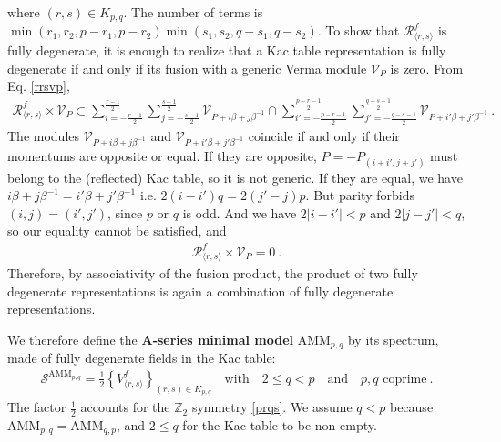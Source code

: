 \documentclass[12pt, a4paper]{article}
\newcommand{\myindex}[1]{\textbf{\boldmath #1}}
\theoremstyle{break}
\begin{document}
where $(r,s)\in K_{p,q}$. The number of terms is $\min(r_1,r_2,p-r_1,p-r_2)\min(s_1,s_2,q-s_1,q-s_2)$. To show that $\mathcal{R}^f_{\langle r,s\rangle}$ is fully degenerate, it is enough to realize that a Kac table representation is fully degenerate if and only if its fusion with a generic Verma module $\mathcal{V}_P$ is zero. From Eq. \eqref{rrsvp}, 
\begin{align}
 \mathcal{R}^f_{\langle r,s\rangle}\times \mathcal{V}_P \subset \sum_{i=-\frac{r-1}{2}}^{\frac{r-1}{2}} \sum_{j=-\frac{s-1}{2}}^{\frac{s-1}{2}} \mathcal{V}_{P+i\beta +j\beta^{-1}} \cap \sum_{i'=-\frac{p-r-1}{2}}^{\frac{p-r-1}{2}} \sum_{j'=-\frac{q-s-1}{2}}^{\frac{q-s-1}{2}} \mathcal{V}_{P+i'\beta +j'\beta^{-1}}\ .
\end{align}
The modules $\mathcal{V}_{P+i\beta +j\beta^{-1}}$ and $\mathcal{V}_{P+i'\beta +j'\beta^{-1}}$ coincide if and only if their momentums are opposite or equal. If they are opposite, $P=-P_{(i+i',j+j')}$ must belong to the (reflected) Kac table, so it is not generic. If they are equal, we have $i\beta +j\beta^{-1} = i'\beta +j'\beta^{-1}$ i.e. $2(i-i')q = 2(j'-j)p$. 
But parity forbids $(i,j)=(i',j')$, since $p$ or $q$ is odd. And we have $2|i-i'|<p$ and $2|j-j'|<q$, so our equality cannot be satisfied, and 
\begin{align}
 \mathcal{R}^f_{\langle r,s\rangle}\times \mathcal{V}_P = 0 \ . 
\end{align}
Therefore, by associativity of the fusion product, the product of two fully degenerate representations is again a combination of fully degenerate representations.

We therefore define the \myindex{A-series minimal model} AMM$_{p,q}$ by its spectrum, made of fully degenerate fields in the Kac table:
\begin{align}
 \boxed{\mathcal{S}^{\text{AMM}_{p,q}} = \frac12\left\{ V^f_{\langle r,s\rangle} \right\}_{(r,s)\in K_{p,q}} \quad \text{with} \quad 2\leq q<p \quad \text{and} \quad p, q \text{ coprime}}\ .
 \label{samm}
\end{align}
The factor $\frac12$ accounts for the $\mathbb{Z}_2$ symmetry \eqref{prqs}. We assume $q<p$ because AMM$_{p, q}=$AMM$_{q,p}$, and $2\leq q$ for the Kac table to be non-empty.
\end{document}
